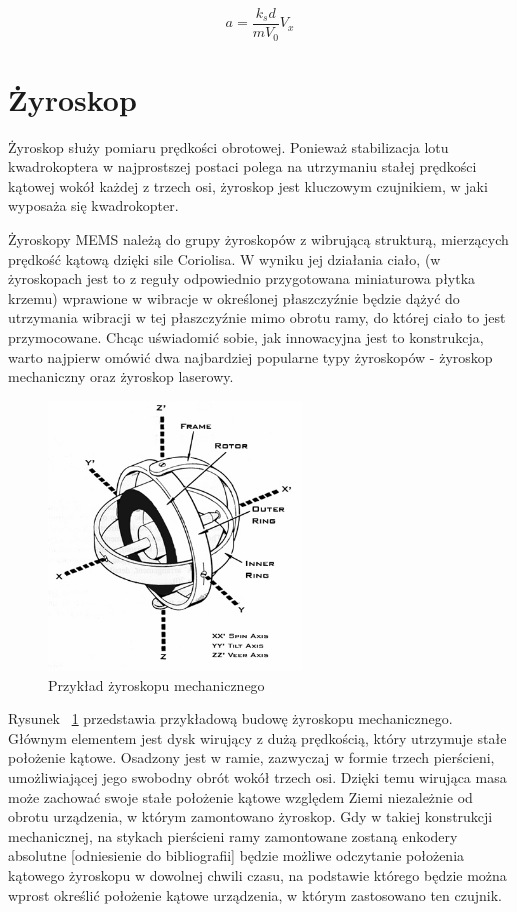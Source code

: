 \begin{equation}
	a = \frac{k{_s}d}{mV_0}V_x
\end{equation}

\section{Żyroskop}

Żyroskop służy pomiaru prędkości obrotowej. Ponieważ stabilizacja lotu kwadrokoptera w najprostszej postaci polega na utrzymaniu stałej prędkości kątowej wokół każdej z trzech osi, żyroskop jest kluczowym czujnikiem, w jaki wyposaża się kwadrokopter. 

Żyroskopy MEMS należą do grupy żyroskopów z wibrującą strukturą, mierzących prędkość kątową dzięki sile Coriolisa. W wyniku jej działania ciało, (w żyroskopach jest to z reguły odpowiednio przygotowana miniaturowa płytka krzemu) wprawione w wibracje w określonej płaszczyźnie będzie dążyć do utrzymania wibracji w tej płaszczyźnie mimo obrotu ramy, do której ciało to jest przymocowane. Chcąc uświadomić sobie, jak innowacyjna jest to konstrukcja, warto najpierw omówić dwa najbardziej popularne typy żyroskopów - żyroskop mechaniczny oraz żyroskop laserowy.

\begin{figure}[H]
	\centering
	\includegraphics[width=0.6\textwidth]{Pictures/Gyroscope_Theory.jpg}
	\caption[Przykład żyroskopu mechanicznego]{Przykład żyroskopu mechanicznego}
	\label{fig:Gyroscope_Theory}
\end{figure}

Rysunek ~\ref{fig:Gyroscope_Theory} przedstawia przykładową budowę żyroskopu mechanicznego. Głównym elementem jest dysk wirujący z dużą prędkością, który utrzymuje stałe położenie kątowe. Osadzony jest w ramie, zazwyczaj w formie trzech pierścieni, umożliwiającej jego swobodny obrót wokół trzech osi. Dzięki temu wirująca masa może zachować swoje stałe położenie kątowe względem Ziemi niezależnie od obrotu urządzenia, w którym zamontowano żyroskop. Gdy w takiej konstrukcji mechanicznej, na stykach pierścieni ramy zamontowane zostaną enkodery absolutne [odniesienie do bibliografii] będzie możliwe odczytanie położenia kątowego żyroskopu w dowolnej chwili czasu, na podstawie którego będzie można wprost określić położenie kątowe urządzenia, w którym zastosowano ten czujnik. 

